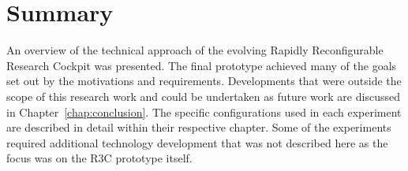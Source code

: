 \section{Summary}

An overview of the technical approach of the evolving Rapidly Reconfigurable Research Cockpit was presented.
The final prototype achieved many of the goals set out by the motivations and requirements.
Developments that were outside the scope of this research work and could be undertaken as future work are discussed in Chapter~\ref{chap:conclusion}.
The specific configurations used in each experiment are described in detail within their respective chapter.
Some of the experiments required additional technology development that was not described here as the focus was on the R3C prototype itself.
